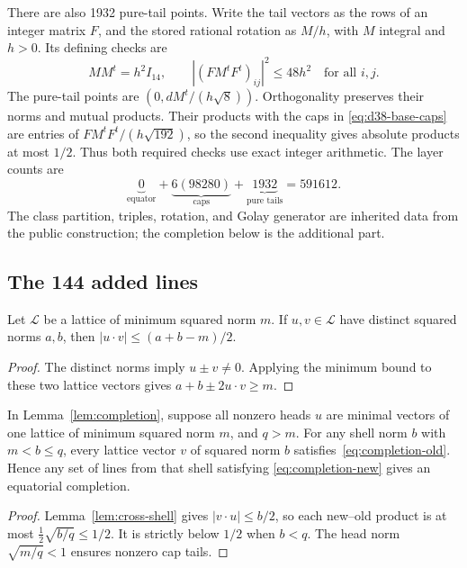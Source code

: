 There are also 1932 pure-tail points. Write the tail vectors as the
rows of an integer matrix $F$, and the stored rational rotation as
$M/h$, with $M$ integral and $h>0$. Its defining checks are
\begin{equation}\label{eq:d38-rotation}
 MM^t=h^2I_{14},\qquad
 |(FM^tF^t)_{ij}|^2\le48h^2\quad\text{for all }i,j.
\end{equation}
The pure-tail points are $(0,dM^t/(h\sqrt8))$. Orthogonality preserves
their norms and mutual products. Their products with the caps in
\eqref{eq:d38-base-caps} are entries of
$FM^tF^t/(h\sqrt{192})$, so the second inequality gives absolute
products at most $1/2$. Thus both required checks use exact integer
arithmetic. The layer counts are
\[
 \underbrace{0}_{\text{equator}}+
 \underbrace{6(98280)}_{\text{caps}}+
 \underbrace{1932}_{\text{pure tails}}=591612.
\]
The class partition, triples, rotation, and Golay generator are
inherited data from the public construction; the completion below
is the additional part.

\subsection{The 144 added lines}
\begin{lemma}\label{lem:cross-shell}
Let $\mathcal L$ be a lattice of minimum squared norm $m$.
If $u,v\in\mathcal L$ have distinct squared norms $a,b$, then
$|u\cdot v|\le(a+b-m)/2$.
\end{lemma}
\begin{proof}
The distinct norms imply $u\pm v\ne0$. Applying the minimum bound
to these two lattice vectors gives $a+b\pm2u\cdot v\ge m$.
\end{proof}

\begin{corollary}\label{cor:completion-window}
In Lemma~\ref{lem:completion}, suppose all nonzero heads $u$ are
minimal vectors of one lattice of minimum squared norm $m$, and
$q>m$. For any shell norm $b$ with $m<b\le q$, every lattice vector
$v$ of squared norm $b$ satisfies~\eqref{eq:completion-old}.
Hence any set of lines from that shell satisfying
\eqref{eq:completion-new} gives an equatorial completion.
\end{corollary}
\begin{proof}
Lemma~\ref{lem:cross-shell} gives $|v\cdot u|\le b/2$, so each new--old
product is at most $\frac12\sqrt{b/q}\le1/2$. It is strictly below
$1/2$ when $b<q$. The head norm $\sqrt{m/q}<1$ ensures nonzero cap tails.
\end{proof}

